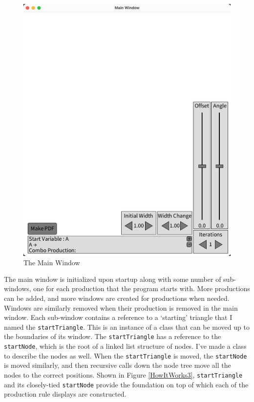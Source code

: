 \documentclass[12pt,twoside]{reedthesis}
\newcommand{\code}[1]{\texttt{#1}}
\begin{document}
	\begin{figure}[h!]
	\centering
	\includegraphics[scale=0.5, frame]{Images/HowItWorks1}
	\caption{The Main Window}
	\label {MainWindow}
	\end{figure}

	
	The main window is initialized upon startup along with some number of sub-windows, one for each production that the program starts with. More productions can be added, and more windows are created for productions when needed. Windows are similarly removed when their production is removed in the main window. Each sub-window contains a reference to a `starting' triangle that I named the \code{startTriangle}. This is an instance of a class that can be moved up to the boundaries of its window. The \code{startTriangle} has a reference to the \code{startNode}, which is the root of a linked list structure of nodes. I've made a class to describe the nodes as well. When the \code{startTriangle} is moved, the \code{startNode} is moved similarly, and then recursive calls down the node tree move all the nodes to the correct positions. Shown in Figure \ref{HowItWorks3}, \code{startTriangle} and its closely-tied \code{startNode} provide the foundation on top of which each of the production rule displays are constructed.
	
\end{document}

